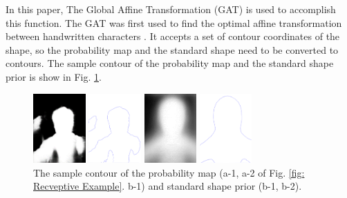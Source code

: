 In this paper, The Global Affine Transformation (GAT) is used to accomplish this function. The GAT was first used to find the optimal affine transformation between handwritten characters \cite{GAT:wakahara1998adaptive} \cite{GAT:xiaona2007hierarchical}. It accepts a set of contour coordinates of the shape, so the probability map and the standard shape need to be converted to contours. The sample contour of the probability map and the standard shape prior is show in Fig. \ref{fig: The sample contour of the probability map and standard shape prior}.
\begin{figure}[h]
    \centering
    \begin{minipage}[b]{2cm}
        \centering
        \includegraphics[width=2cm]{figs/GAT_Contour_1_1.png}
        \caption*{a-1}
    \end{minipage}
    \mbox{\hspace{1cm}}
    \begin{minipage}[b]{2cm}
        \centering
        \includegraphics[width=2cm]{figs/GAT_Contour_1_2.png}
        \caption*{a-2}
    \end{minipage}

    \begin{minipage}[b]{2cm}
        \centering
        \includegraphics[width=2cm]{figs/GAT_Contour_2_1.png}
        \caption*{b-1}
    \end{minipage}
    \mbox{\hspace{1cm}}
    \begin{minipage}[b]{2cm}
        \centering
        \includegraphics[width=2cm]{figs/GAT_Contour_2_2.png}
        \caption*{b-2}
    \end{minipage}
    \caption{The sample contour of the probability map (a-1, a-2 of Fig. \ref{fig: Recveptive Example}. b-1) and standard shape prior (b-1, b-2).}
    \label{fig: The sample contour of the probability map and standard shape prior}
\end{figure}
